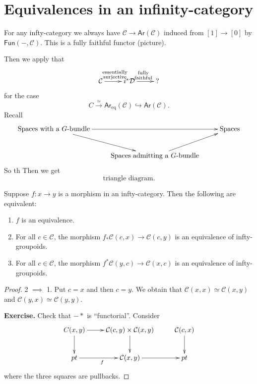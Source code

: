 \section{Equivalences in an
infinity-category}
\label{section-equivalences}

For any infty-category we always have
$\mathcal{C} \to \mathsf{Ar}(\mathcal{C})$
induced
from $[1] \to [0]$ by
$\mathsf{Fun}(-,\mathcal{C})$.
This is a fully faithful functor (picture).

Then we apply that
$$
\xymatrix{
\mathcal{C}\ar[r]
^{\substack{\text{essentially}
\\ \text{surjective}}}&
i^*\mathcal{D}\ar[r]^{\substack{\text{fully}
\\
\text{faithful}}} & ?
}
$$
for the case
$$
C\xrightarrow{\simeq}\mathsf{Ar}_{\text{eq}}
(\mathcal{C})
\hookrightarrow \mathsf{Ar}(\mathcal{C}).
$$
Recall
$$
\xymatrix{
\text{Spaces with a $G$-bundle} \ar[rd]
\ar[rr] && \text{Spaces} \\
& \text{Spaces admitting a $G$-bundle}\ar[ur]
}
$$
So th
Then we get
$$
\text{triangle diagram}.
$$
\begin{lemma}
\label{lemma-equivalence-equivalences}
Suppose $f: x \to y$ is a morphism in an
infty-category.
Then the following are equivalent:

\begin{enumerate}
\item $f$ is an equivalence.
\label{item-equiv1}
\item
\label{item-equiv2}
For all $c \in \mathcal{C}$, the morphism
$f_*\mathcal{C}(c,x) \to \mathcal{C}(c,y)$ is
an equivalence of infty-groupoids.
\item
\label{item-equiv3}
For all $c \in \mathcal{C}$, the morphism
$f^*\mathcal{C}(y,c)\to \mathcal{C}(x,c)$
is an equivalence of infty-groupoids.
\end{enumerate}
\end{lemma}

\begin{proof}
2 $\implies$ 1. Put $c=x$ and then $c=y$. We
obtain that
$\mathcal{C}(x,x) \simeq \mathcal{C}(x,y)$
and $\mathcal{C}(y,x) \simeq
\mathcal{C}(y,y)$.

{\bf Exercise.} Check that $- *$ is
``functorial''.
Consider
$$
\xymatrix{
C(x,y)\ar[r]\ar[d]&\mathcal{C}(c,y)\times
\mathcal{C}(x,y)\ar[d]&
\mathcal{C}(c,x)\ar[d]\\
pt\ar[r]_{f}&\mathcal{C}(x,y)\ar[r]&pt
}
$$
where the three squares are pullbacks.
\end{proof}

